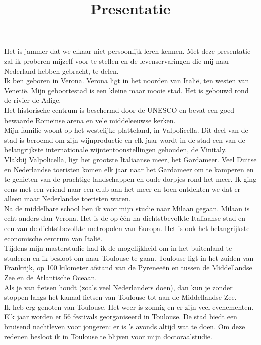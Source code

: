 \documentclass[30pt]{article}
\title{Presentatie}
\begin{document}
	\large


	Het is jammer dat we elkaar niet persoonlijk leren kennen. Met deze presentatie zal ik proberen mijzelf voor te stellen en de levenservaringen die mij naar Nederland hebben gebracht, te delen.  \\
	
	Ik ben geboren in Verona. Verona ligt in het noorden van Italië, ten westen van Venetië. Mijn geboortestad is een kleine maar mooie stad. Het is gebouwd rond de rivier de Adige.\\
	
	Het historische centrum is beschermd door de UNESCO en bevat een goed bewaarde Romeinse arena en vele middeleeuwse kerken. \\
	
	Mijn familie woont op het westelijke platteland, in Valpolicella. Dit deel van de stad is beroemd om zijn wijnproductie en elk jaar wordt in de stad een van de belangrijkste internationale wijntentoonstellingen gehouden, de Vinitaly.\\
	
	Vlakbij Valpolicella, ligt het grootste Italiaanse meer, het Gardameer. Veel Duitse en Nederlandse toeristen komen elk jaar naar het Gardameer om te kamperen en te genieten van de prachtige landschappen en oude dorpjes rond het meer. Ik ging eens met een vriend naar een club aan het meer en toen ontdekten we dat er alleen maar Nederlandse toeristen waren. \\
	
	Na de middelbare school ben ik voor mijn studie naar Milaan gegaan. Milaan is echt anders dan Verona.  Het is de op één na dichtstbevolkte Italiaanse stad en een van de dichtstbevolkte metropolen van Europa. Het is ook het belangrijkste economische centrum van Italië. \\
	
	Tijdens mijn masterstudie had ik de mogelijkheid om in het buitenland te studeren en ik besloot om naar Toulouse te gaan. Toulouse ligt in het zuiden van Frankrijk, op 100 kilometer afstand van de Pyreneeën en tussen de Middellandse Zee en de Atlantische Oceaan. \\
	
	Als je van fietsen houdt (zoals veel Nederlanders doen), dan kun je zonder stoppen langs het kanaal fietsen van Toulouse tot aan de Middellandse Zee. \\
	
	Ik heb erg genoten van Toulouse. Het weer is zonnig en er zijn veel evenementen. Elk jaar worden er 56 festivals georganiseerd in Toulouse. De stad biedt een bruisend nachtleven voor jongeren: er is 's avonds altijd wat te doen. Om deze redenen besloot ik in Toulouse te blijven voor mijn doctoraalstudie. \\
	
\end{document}
